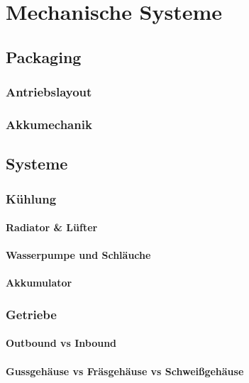 
\chapter{Mechanische Systeme}

\section{Packaging}

\subsection{Antriebslayout}

\subsection{Akkumechanik}

\section{Systeme}

\subsection{Kühlung}

\subsubsection{Radiator \& Lüfter}

\subsubsection{Wasserpumpe und Schläuche}

\subsubsection{Akkumulator}

\subsection{Getriebe}

\subsubsection{Outbound vs Inbound}

\subsubsection{Gussgehäuse vs Fräsgehäuse vs Schweißgehäuse}